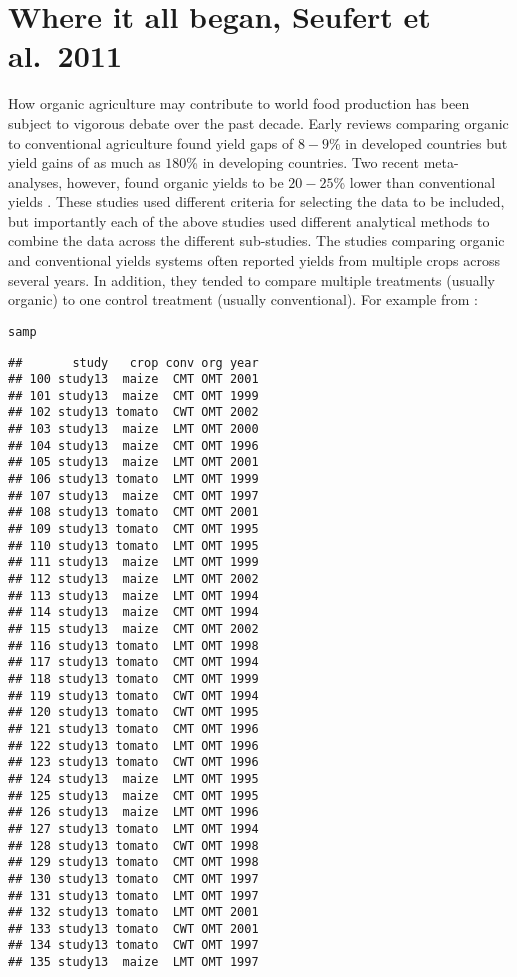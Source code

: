 \documentclass{article}\usepackage[]{graphicx}\usepackage[]{color}
\makeatletter
\newcommand{\hlstd}[1]{\textcolor[rgb]{0.345,0.345,0.345}{#1}}%
\newenvironment{kframe}{%
 \def\at@end@of@kframe{}%
 \ifinner\ifhmode%
  \def\at@end@of@kframe{\end{minipage}}%
  \begin{minipage}{\columnwidth}%
 \fi\fi%
 \def\FrameCommand##1{\hskip\@totalleftmargin \hskip-\fboxsep
 \colorbox{shadecolor}{##1}\hskip-\fboxsep
     \hskip-\linewidth \hskip-\@totalleftmargin \hskip\columnwidth}%
 \MakeFramed {\advance\hsize-\width
   \@totalleftmargin\z@ \linewidth\hsize
   \@setminipage}}%
 {\par\unskip\endMakeFramed%
 \at@end@of@kframe}
\newenvironment{knitrout}{}{} %
\makeatother
\begin{document}
\section{Where it all began, Seufert et al.~2011}
\label{sec:beginning}

How organic agriculture may contribute to world food production has
been subject to vigorous debate over the past decade. Early reviews
comparing organic to conventional agriculture found yield gaps of
$8-9$\% in developed countries \citep{Stanhill1990, Badgley2007} but
yield gains of as much as $180$\% in developing countries. Two recent
meta-analyses, however, found organic yields to be $20-25$\% lower
than conventional yields \citep{dePonti2012, Seufert2012}. These
studies used different criteria for selecting the data to be included,
but importantly each of the above studies used different analytical
methods to combine the data across the different sub-studies. The
studies comparing organic and conventional yields systems often
reported yields from multiple crops across several years. In addition,
they tended to compare multiple treatments (usually organic) to one
control treatment (usually conventional). For example from
\cite{denison2004crop}:

\begin{knitrout}
\color{fgcolor}\begin{kframe}
\begin{alltt}
\hlstd{samp}
\end{alltt}
\begin{verbatim}
##       study   crop conv org year
## 100 study13  maize  CMT OMT 2001
## 101 study13  maize  CMT OMT 1999
## 102 study13 tomato  CWT OMT 2002
## 103 study13  maize  LMT OMT 2000
## 104 study13  maize  CMT OMT 1996
## 105 study13  maize  LMT OMT 2001
## 106 study13 tomato  LMT OMT 1999
## 107 study13  maize  CMT OMT 1997
## 108 study13 tomato  CMT OMT 2001
## 109 study13 tomato  CMT OMT 1995
## 110 study13 tomato  LMT OMT 1995
## 111 study13  maize  LMT OMT 1999
## 112 study13  maize  LMT OMT 2002
## 113 study13  maize  LMT OMT 1994
## 114 study13  maize  CMT OMT 1994
## 115 study13  maize  CMT OMT 2002
## 116 study13 tomato  LMT OMT 1998
## 117 study13 tomato  CMT OMT 1994
## 118 study13 tomato  CMT OMT 1999
## 119 study13 tomato  CWT OMT 1994
## 120 study13 tomato  CWT OMT 1995
## 121 study13 tomato  CMT OMT 1996
## 122 study13 tomato  LMT OMT 1996
## 123 study13 tomato  CWT OMT 1996
## 124 study13  maize  LMT OMT 1995
## 125 study13  maize  CMT OMT 1995
## 126 study13  maize  LMT OMT 1996
## 127 study13 tomato  LMT OMT 1994
## 128 study13 tomato  CWT OMT 1998
## 129 study13 tomato  CMT OMT 1998
## 130 study13 tomato  CMT OMT 1997
## 131 study13 tomato  LMT OMT 1997
## 132 study13 tomato  LMT OMT 2001
## 133 study13 tomato  CWT OMT 2001
## 134 study13 tomato  CWT OMT 1997
## 135 study13  maize  LMT OMT 1997
\end{verbatim}
\end{kframe}
\end{knitrout}
\end{document}
